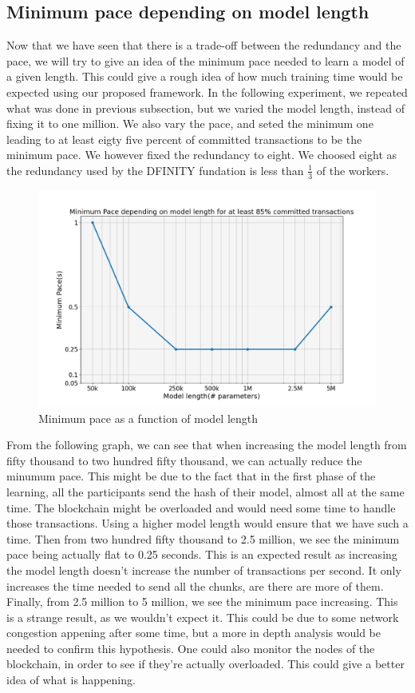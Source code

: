 \documentclass{article}
\begin{document}
\subsection{Minimum pace depending on model length}
Now that we have seen that there is a trade-off between the redundancy and the pace, we will try to give an idea of the
minimum pace needed to learn a model of a given length. This could give a rough idea of how much training time would be
expected using our proposed framework. In the following experiment, we repeated what was done in previous subsection,
but we varied the model length, instead of fixing it to one million. We also vary the pace, and seted the minimum one leading
to at least eigty five percent of committed transactions to be the minimum pace. We however fixed the redundancy to eight. We choosed eight as
the redundancy used by the DFINITY fundation is less than $\frac{1}{3}$ \cite{DFINITY_redundancy} of the workers.
\begin{figure}[H]
    \hspace*{-2cm}
        \includegraphics[scale=0.5]{length_pace}
    \hspace{2mm}%
    \caption{Minimum pace as a function of model length}
\end{figure}
From the following graph, we can see that when increasing the model length from fifty thousand to two hundred
fifty thousand, we can actually reduce the minumum pace. This might be due to the fact that in the first phase of the
learning, all the participants send the hash of their model, almost all at the same time. The blockchain might be overloaded
and would need some time to handle those transactions. Using a higher model length would ensure that we have such a time.
Then from two hundred fifty thousand to 2.5 million, we see the minimum pace being actually flat to 0.25 seconds. This is an expected result
as increasing the model length doesn't increase the number of transactions per second. It only increases the time needed to
send all the chunks, are there are more of them. Finally, from 2.5 million to 5 million, we see the minimum pace increasing.
This is a strange result, as we wouldn't expect it. This could be due to some network congestion appening after some time,
but a more in depth analysis would be needed to confirm this hypothesis. One could also monitor the nodes of the blockchain,
in order to see if they're actually overloaded. This could give a better idea of what is happening.
\end{document}
